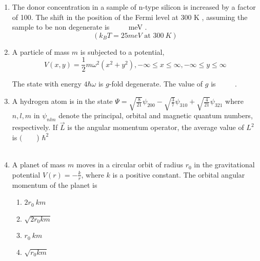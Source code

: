 \documentclass[journal]{IEEEtran}
\begin{document}
\begin{enumerate}
    

 
    \item  The donor concentration in a sample of n-type silicon is increased by a factor of 100. The shift in the position of the Fermi level at 300 K , assuming the sample to be non degenerate is $\qquad$ meV .
$$
(k_{B} T=25 {meV} \text { at } 300 {~K})
$$
   
        
  \item   A particle of mass $m$ is subjected to a potential,
$$
V(x, y)=\frac{1}{2} m \omega^{2}(x^{2}+y^{2}),-\infty \leq x \leq \infty,-\infty \leq y \leq \infty
$$

The state with energy $4 \hbar \omega$ is $g$-fold degenerate. The value of $g$ is $\qquad$ .
 
  
  \item A hydrogen atom is in the state
$\Psi=\sqrt{\frac{8}{21}} \psi_{200}-\sqrt{\frac{3}{7}} \psi_{310}+\sqrt{\frac{4}{21}} \psi_{321}$
where $n, l, m$ in $\psi_{n l m}$ denote the principal, orbital and magnetic quantum numbers, respectively. If $\vec{L}$ is the angular momentum operator, the average value of $L^{2}$ is $(\qquad$) $\hbar^{2}$\\\\
  
  \item A planet of mass $m$ moves in a circular orbit of radius $r_{0}$ in the gravitational potential $V(r)=-\frac{k}{r}$, where $k$ is a positive constant. The orbital angular momentum of the planet is
  \begin{multicols}{4}
			\begin{enumerate}
   \item $2 r_{0} {~km}$
\item $\sqrt{2 r_{0} k m}$
\item $r_{0} {~km}$
\item  $\sqrt{r_{0} k m}$
\end{enumerate}
		\end{multicols}
   

\end{enumerate}
\end{document}
